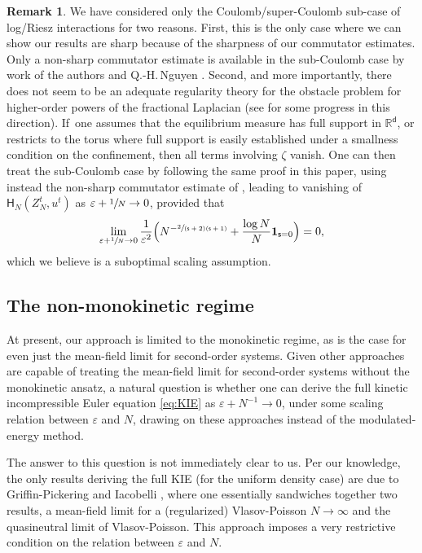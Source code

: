 \documentclass[JEP,XML,SOM,Unicode,published]{cedram}
\theoremstyle{plain}
\theoremstyle{definition}
\newtheorem{remark}[thm]{Remark}
\newcommand{\Bpa}[1]{\Bigl(#1\Bigr)}
\newcommand{\R}{{\mathbb{R}}}
\let\vep\varepsilon
\let\uz Z
\newcommand{\indic}{\mathbf{1}}
\newcommand{\Hr}{\mathsf{H}}
\renewcommand{\d}{\mathsf{d}}
\newcommand{\s}{\mathsf{s}}
\begin{document}
\begin{remark}\label{rem:SCrest}
We have considered only the Coulomb/super-Coulomb sub-case of log/Riesz interactions for two reasons. First, this is the only case where we can show our results are sharp because of the sharpness of our commutator estimates. Only a non-sharp commutator estimate is available in the sub-Coulomb case by work of the authors and Q.-H.\,Nguyen \cite{NRS2021}. Second, and more importantly, there does not seem to be an adequate regularity theory for the obstacle problem for higher-order powers of the fractional Laplacian (see \cite{DHP2023} for some progress in this direction). If~one assumes that the equilibrium measure has full support in $\R^\d$, or restricts to the torus where full support is easily established under a smallness condition on the confinement, then all terms involving $\zeta$ vanish. One can then treat the sub-Coulomb case by following the same proof in this paper, using instead the non-sharp commutator estimate of \cite{NRS2021}, leading to vanishing of $\Hr_{N}(\uz_N^t,u^t)$ as $\vep+\sfrac{1}{N}\to 0$, provided that\vspace*{-3pt}\enlargethispage{.5\baselineskip}
\begin{equation*}
\lim_{\vep+\sfrac{1}{N}\to 0} \frac{1}{\vep^2}\Bpa{N^{-\sfrac{2}{(\s+2)(\s+1)}}+\frac{\log N}{N}\indic_{\s=0}} =0,
\end{equation*}
which we believe is a suboptimal scaling assumption.
\end{remark}

\subsection{The non-monokinetic regime}
At present, our approach is limited to the monokinetic regime, as is the case for even just the mean-field limit for second-order systems. Given other approaches are capable of treating the mean-field limit for second-order systems without the monokinetic ansatz, a natural question is whether one can derive the full kinetic incompressible Euler equation \eqref{eq:KIE} as $\vep + N^{-1}\to 0$, under some scaling relation between $\vep$ and $N$, drawing on these approaches instead of the modulated-energy method.

The answer to this question is not immediately clear to us. Per our knowledge, the only results deriving the full KIE (for the uniform density case) are due to Griffin-Pickering and Iacobelli \cite{GpI2018, GpI2020sing}, where one essentially sandwiches together two results, a mean-field limit for a (regularized) Vlasov-Poisson $N\to\infty$ and the quasineutral limit of Vlasov-Poisson. This approach imposes a very restrictive condition on the relation between $\vep$ and $N$.
\end{document}
